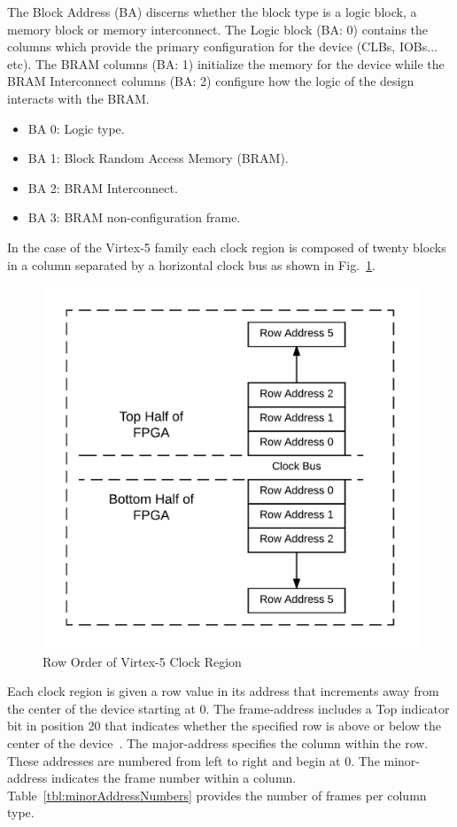 \documentclass[journal, hidelinks]{IEEEtran}
\begin{document}
The Block Address (BA) discerns whether the block type is a logic block, a memory block or memory interconnect.
The Logic block (BA: 0) contains the columns which provide the primary configuration for the device (CLBs, IOBs... etc).
The BRAM columns (BA: 1) initialize the memory for the device while the BRAM Interconnect columns (BA: 2) configure how the logic of the design interacts with the BRAM.
\begin{itemize}
	\item BA 0: Logic type.
	\item BA 1: Block Random Access Memory (BRAM).
	\item BA 2: BRAM Interconnect.
	\item BA 3: BRAM non-configuration frame.
\end{itemize}
In the case of the Virtex-5 family each clock region is composed of twenty blocks in a column separated by a horizontal clock bus as shown in Fig.~\ref{fig:RowOrder}.
\begin{figure}[h]
	\centering
	\includegraphics[width=1\linewidth]{Figures/RowOrder}
	\caption[Row Order of Virtex-5 Clock Region]{Row Order of Virtex-5 Clock Region}
	\label{fig:RowOrder}
\end{figure}
Each clock region is given a row value in its address that increments away from the center of the device starting at 0. 
The frame-address includes a Top indicator bit in position 20 that indicates whether the specified row is above or below the center of the device~\cite{virtex5ConfigGuide}.
The major-address specifies the column within the row.
These addresses are numbered from left to right and begin at 0.
The minor-address indicates the frame number within a column. 
Table~\ref{tbl:minorAddressNumbers} provides the number of frames per column type.
\end{document}
